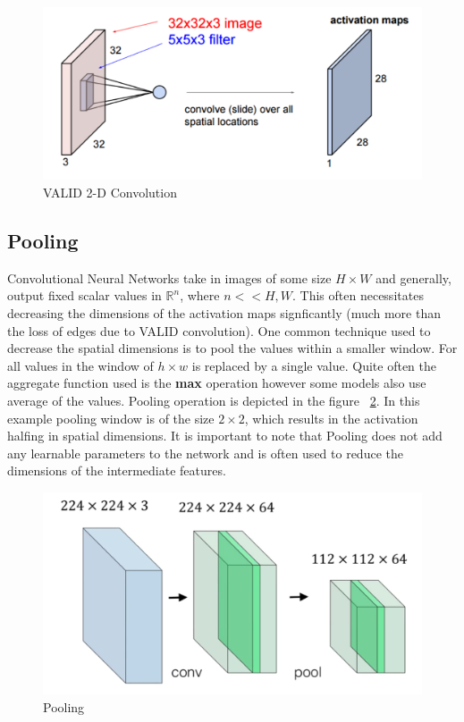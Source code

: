 \begin{figure}[H]
	\centering
   \includegraphics[scale=0.50]{figures/intro/cnn2d.png}
   \caption[2-D Convolution]{VALID 2-D Convolution}
   \label{fig:cnn2d}
\end{figure}

\subsection{Pooling}

Convolutional Neural Networks take in images of some size $H \times W$ and generally, output fixed scalar values in $\mathbb{R}^n$, where $n << H, W$. This often necessitates decreasing the dimensions of the activation maps signficantly (much more than the loss of edges due to VALID convolution). One common technique used to decrease the spatial dimensions is to pool the values within a smaller window. For all values in the window of $h \times w$ is replaced by a single value. Quite often the aggregate function used is the \textbf{max} operation however some models also use average of the values. Pooling operation is depicted in the figure ~\ref{fig:pool}. In this example pooling window is of the size $2\times2$, which results in the activation halfing in spatial dimensions. 
It is important to note that Pooling does not add any learnable parameters to the network and is often used to reduce the dimensions of the intermediate features.

\begin{figure}[H]
	\centering
   \includegraphics[scale=0.50]{figures/intro/pool.png}
   \caption[Pooling]{Pooling}
   \label{fig:pool}
\end{figure}

